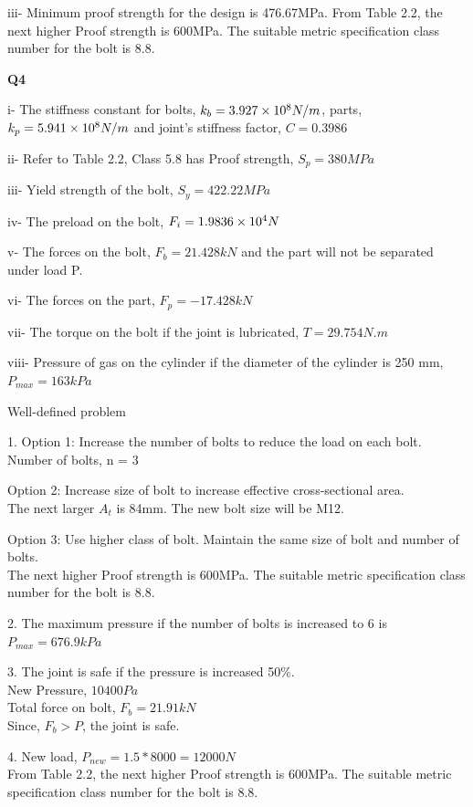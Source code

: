 \documentclass[a4paper, fleqn]{article}
\providecommand{\sci}[1]{\protect\ensuremath{\times 10^{\StrSubstitute[0]{#1}{e}{}}}}
\begin{document}
iii- Minimum proof strength for the design is 476.67MPa.
From Table 2.2, the next higher Proof strength is 600MPa. The suitable metric specification class number for the bolt is 8.8.

\vspace{10pt}
\textbf{Q4}


i- The stiffness constant for bolts, $k_b=3.927\sci{e8}N/m$, parts, $k_p=5.941\sci{e8}N/m$ and joint’s stiffness factor, $C=0.3986$

ii- Refer to Table 2.2, Class 5.8 has Proof strength, $S_p=380MPa$

iii- Yield strength of the bolt, $S_y=422.22MPa$

iv- The preload on the bolt, $F_i=1.9836\sci{e4}N$

v- The forces on the bolt, $F_b=21.428kN$ and the part will not be separated under load P.

vi- The forces on the part, $F_p=-17.428kN$

vii- The torque on the bolt if the joint is lubricated, $T=29.754N.m$

viii- Pressure of gas on the cylinder if the diameter of the cylinder is 250 mm, $P_{max}=163kPa$

\vspace{10pt}
Well-defined problem

1. Option 1: Increase the number of bolts to reduce the load on each bolt.
Number of bolts, n = 3

Option 2: Increase size of bolt to increase effective cross-sectional area. \\
The next larger $A_t$ is 84mm. The new bolt size will be M12.

Option 3: Use higher class of bolt. Maintain the same size of bolt and number of bolts. \\
The next higher Proof strength is 600MPa. The suitable metric specification class number for the bolt is 8.8.

2. The maximum pressure if the number of bolts is increased to 6 is $P_{max}=676.9kPa$

3. The joint is safe if the pressure is increased 50\%. \\
New Pressure, $10400Pa$ \\
Total force on bolt, $F_b=21.91kN$ \\
Since, $F_b >P$, the joint is safe.

4. New load, $P_{new}=1.5*8000=12000N$ \\
From Table 2.2, the next higher Proof strength is 600MPa.
The suitable metric specification class number for the bolt is 8.8.
\end{document}

